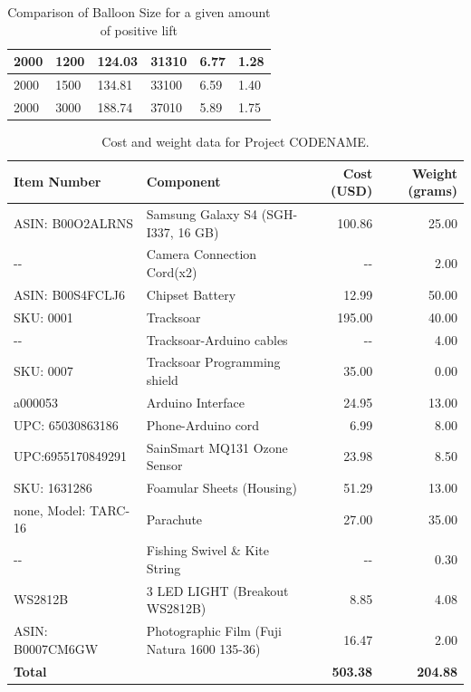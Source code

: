 \documentclass[english]{report}
\begin{document}
\begin{appendices}
\begin{table}[]
\begin{tabular}{@{}llllll@{}}
  \multicolumn{1}{|l|}{2000} & \multicolumn{1}{l|}{1200} & \multicolumn{1}{l|}{124.03} & \multicolumn{1}{l|}{31310} & \multicolumn{1}{l|}{6.77} & \multicolumn{1}{l|}{1.28} \\ \midrule
  \multicolumn{1}{|l|}{2000} & \multicolumn{1}{l|}{1500} & \multicolumn{1}{l|}{134.81} & \multicolumn{1}{l|}{33100} & \multicolumn{1}{l|}{6.59} & \multicolumn{1}{l|}{1.40} \\ \midrule
  2000 & 3000 & 188.74 & 37010 & 5.89 & 1.75 \\ \bottomrule
  \end{tabular}
  \caption{Comparison of Balloon Size for a given amount of positive lift}
  \end{table}
\end{appendices}

\begin{table}[H]
\begin{raggedright}
\begin{tabular}{|l|l|r|r|}
\hline
\textbf{Item Number} & \textbf{Component} & \textbf{Cost (USD)} & \textbf{Weight (grams)}\tabularnewline
\hline
\hline
ASIN: B00O2ALRNS & Samsung Galaxy S4 (SGH-I337, 16 GB) & 100.86 & 25.00\tabularnewline
\hline
-{}- & Camera Connection Cord(x2) & -{}- & 2.00\tabularnewline
\hline
ASIN: B00S4FCLJ6 & Chipset Battery & 12.99 & 50.00\tabularnewline
\hline
SKU: 0001 & Tracksoar & 195.00 & 40.00\tabularnewline
\hline
-{}- & Tracksoar-Arduino cables & -{}- & 4.00\tabularnewline
\hline
SKU: 0007 & Tracksoar Programming shield & 35.00 & 0.00\tabularnewline
\hline
a000053 & Arduino Interface & 24.95 & 13.00\tabularnewline
\hline
UPC: 65030863186 & Phone-Arduino cord & 6.99 & 8.00\tabularnewline
\hline
UPC:6955170849291 & SainSmart MQ131 Ozone Sensor & 23.98 & 8.50\tabularnewline
\hline
SKU: 1631286 & Foamular Sheets (Housing) & 51.29 & 13.00\tabularnewline
\hline
none, Model: TARC-16 & Parachute & 27.00 & 35.00\tabularnewline
\hline
-{}- & Fishing Swivel \& Kite String & -{}- & 0.30\tabularnewline
\hline
WS2812B & 3 LED LIGHT (Breakout WS2812B) & 8.85 & 4.08\tabularnewline
\hline
ASIN: B0007CM6GW & Photographic Film (Fuji Natura 1600 135-36) & 16.47 & 2.00\tabularnewline
\hline
\textbf{Total} &  & \textbf{503.38} & \textbf{204.88}\tabularnewline
\hline
\end{tabular}
\par\end{raggedright}
\caption{Cost and weight data for Project CODENAME.}

\end{table}
\end{document}
